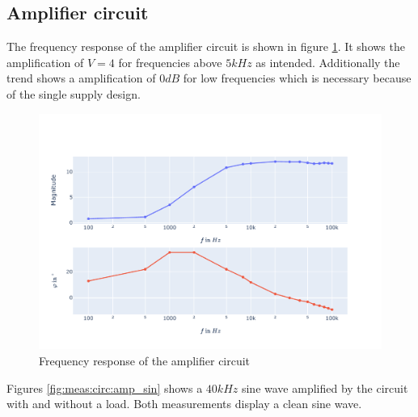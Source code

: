 \subsection{Amplifier circuit}

The frequency response of the amplifier circuit is shown in figure \ref{fig:meas:circ:amp_bode}. It shows the amplification of $V=4$ for frequencies above $5kHz$ as intended. Additionally the trend shows a amplification of $0dB$ for low frequencies which is necessary because of the single supply design.
%
\begin{figure}
  \centering
  \includegraphics[height=\largeheight]{src/assets/pictures/measurements/amp_bode.pdf}
  \caption{Frequency response of the amplifier circuit}\label{fig:meas:circ:amp_bode}
\end{figure}
\p
Figures \ref{fig:meas:circ:amp_sin} shows a $40kHz$ sine wave amplified by the circuit with and without a load. Both measurements display a clean sine wave.
%
